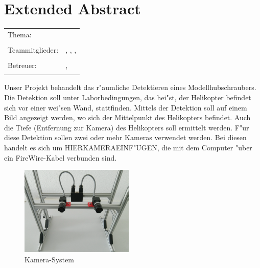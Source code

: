 \chapter*{Extended Abstract}

\begin{center}
	\begingroup
	\renewcommand*{\arraystretch}{1}
	{\makeatletter	
		\begin{tabular}{p{3.2cm}p{9.6cm}}
			Thema: & \thema \\
			& \\
			Teammitglieder: & \verfasserA, \verfasserB, 
			\verfasserC, \verfasserD\\
			& \\
			Betreuer: & \hoschschule \newline \institut \newline \prueferA, \prueferB \\
			& \\
		\end{tabular}
		
		\makeatother}
	\endgroup
\end{center}

\bigskip

\noindent
Unser Projekt behandelt das r"aumliche Detektieren eines Modellhubschraubers. Die Detektion soll unter Laborbedingungen, das hei"st, der Helikopter befindet sich vor einer wei"sen Wand, stattfinden. Mittels der Detektion soll auf einem Bild angezeigt werden, wo sich der Mittelpunkt des Helikopters befindet. Auch die Tiefe (Entfernung zur Kamera) des Helikopters soll ermittelt werden. F"ur diese Detektion sollen zwei oder mehr Kameras verwendet werden. Bei diesen handelt es sich um HIERKAMERAEINF"UGEN, die mit dem Computer "uber ein FireWire-Kabel verbunden sind.\newline

\begin{figure}[H]
	\includegraphics[scale=1.5]{bilder/camerasystem}
	\caption[Kamera-System]{Kamera-System}
\end{figure}


